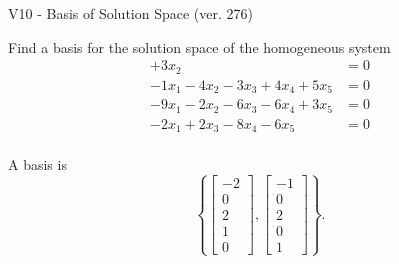 \begin{exercise}
  \begin{exerciseTitle}V10 - Basis of Solution Space (ver. 276)\end{exerciseTitle}
  \begin{exerciseStatement}
    Find a basis for the solution space of the homogeneous system 
\begin{align*}
 + 3 x_ 2 &= 0  \\ 
  -1 x_ 1 -4 x_ 2 -3 x_ 3 + 4 x_ 4 + 5 x_ 5 &= 0  \\ 
  -9 x_ 1 -2 x_ 2 -6 x_ 3 -6 x_ 4 + 3 x_ 5 &= 0  \\ 
  -2 x_ 1 + 2 x_ 3 -8 x_ 4 -6 x_ 5 &= 0  \\ 
 \end{align*}


 
  \end{exerciseStatement}

  \begin{exerciseAnswer}
   A basis is   
\[\left\{\left[\begin{array}{c}
-2 \\
0 \\
2 \\
1 \\
0
\end{array}\right] , \left[\begin{array}{c}
-1 \\
0 \\
2 \\
0 \\
1
\end{array}\right]\right\}.\]

  


  \end{exerciseAnswer}
\end{exercise}